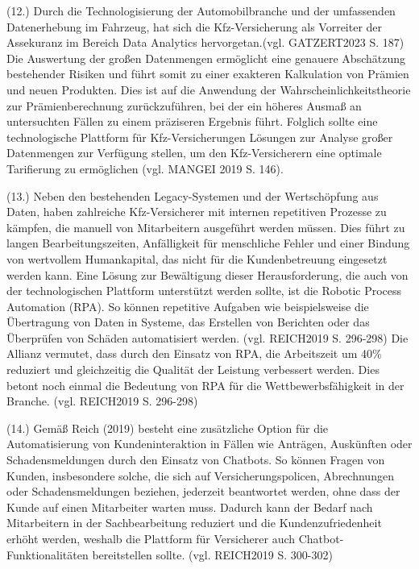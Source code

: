 (12.) Durch die Technologisierung der Automobilbranche und der umfassenden Datenerhebung im Fahrzeug, hat sich die Kfz-Versicherung als Vorreiter der Assekuranz im Bereich Data Analytics hervorgetan.(vgl. GATZERT2023 S. 187) Die Auswertung der großen Datenmengen ermöglicht eine genauere Abschätzung bestehender Risiken und führt somit zu einer exakteren Kalkulation von Prämien und neuen Produkten. Dies ist auf die Anwendung der Wahrscheinlichkeitstheorie zur Prämienberechnung zurückzuführen, bei der ein höheres Ausmaß an untersuchten Fällen zu einem präziseren Ergebnis führt. Folglich sollte eine technologische Plattform für Kfz-Versicherungen Lösungen zur Analyse großer Datenmengen zur Verfügung stellen, um den Kfz-Versicherern eine optimale Tarifierung zu ermöglichen (vgl. MANGEI 2019 S. 146). 

(13.) Neben den bestehenden Legacy-Systemen und der Wertschöpfung aus Daten, haben zahlreiche Kfz-Versicherer mit internen repetitiven Prozesse zu kämpfen, die manuell von Mitarbeitern ausgeführt werden müssen. Dies führt zu langen Bearbeitungszeiten, Anfälligkeit für menschliche Fehler und einer Bindung von wertvollem Humankapital, das nicht für die Kundenbetreuung eingesetzt werden kann. Eine Lösung zur Bewältigung dieser Herausforderung, die auch von der technologischen Plattform unterstützt werden sollte, ist die Robotic Process Automation (RPA). So können repetitive Aufgaben wie beispielsweise die Übertragung von Daten in Systeme, das Erstellen von Berichten oder das Überprüfen von Schäden automatisiert werden. (vgl. REICH2019 S. 296-298)  Die Allianz vermutet, dass durch den Einsatz von RPA, die Arbeitszeit um 40\% reduziert und gleichzeitig die Qualität der Leistung verbessert werden. Dies betont noch einmal die Bedeutung von RPA für die Wettbewerbsfähigkeit in der Branche. (vgl. REICH2019 S. 296-298) 

(14.) Gemäß Reich (2019) besteht eine zusätzliche Option für die Automatisierung von Kundeninteraktion in Fällen wie Anträgen, Auskünften oder Schadensmeldungen durch den Einsatz von Chatbots. So können Fragen von Kunden, insbesondere solche, die sich auf Versicherungspolicen, Abrechnungen oder Schadensmeldungen beziehen, jederzeit beantwortet werden, ohne dass der Kunde auf einen Mitarbeiter warten muss. Dadurch kann der Bedarf nach Mitarbeitern in der Sachbearbeitung reduziert und die Kundenzufriedenheit erhöht werden, weshalb die Plattform für Versicherer auch Chatbot-Funktionalitäten bereitstellen sollte. (vgl. REICH2019 S. 300-302)

